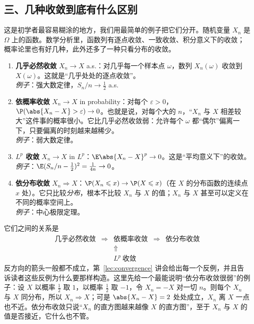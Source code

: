 \subsection*{三、几种收敛到底有什么区别}

这是初学者最容易糊涂的地方，我们用最简单的例子把它们分开。随机变量 $X_n$ 是 $\Omega$ 上的函数。数学分析里，函数列有逐点收敛、一致收敛、积分意义下的收敛；概率论里也有好几种，此外还多了一种只看分布的收敛。

\begin{enumerate}
\item \textbf{几乎必然收敛} $X_n\to X$ a.s.：对几乎每一个样本点 $\omega$，数列 $X_n(\omega)$ 收敛到 $X(\omega)$。这就是“几乎处处的逐点收敛”。\\
\emph{例子}：强大数定律，$S_n/n\to\frac12$ a.s.
\item \textbf{依概率收敛} $X_n\to X$ in probability：对每个 $\varepsilon>0$，$\P(\abs{X_n-X}>\varepsilon)\to0$。也就是说，对每个大的 $n$，“$X_n$ 与 $X$ 相差较大”这件事的概率很小。它比几乎必然收敛弱：允许每个 $\omega$ 都“偶尔”偏离一下，只要偏离的时刻越来越稀少。\\
\emph{例子}：弱大数定律。
\item \textbf{$L^p$ 收敛} $X_n\to X$ in $L^p$：$\E\abs{X_n-X}^p\to0$。这是“平均意义下”的收敛。\\
\emph{例子}：$\E(S_n/n-\frac12)^2=\frac1{4n}\to0$。
\item \textbf{依分布收敛} $X_n\Rightarrow X$：$\P(X_n\leqslant x)\to \P(X\leqslant x)$（在 $X$ 的分布函数的连续点 $x$ 处）。它只比较\emph{分布}，根本不比较 $X_n$ 与 $X$ 的值；$X_n$ 与 $X$ 甚至可以定义在不同的概率空间上。\\
\emph{例子}：中心极限定理。
\end{enumerate}

它们之间的关系是
\[
\begin{array}{ccccc}
\text{几乎必然收敛}&\Longrightarrow&\text{依概率收敛}&\Longrightarrow&\text{依分布收敛}\\
&&\Uparrow&&\\
&&L^p\ \text{收敛}&&
\end{array}
\]
反方向的箭头一般都不成立，第~\ref{lec:convergence} 讲会给出每一个反例，并且告诉读者这些反例为什么要那样构造。这里先给一个最能说明“依分布收敛很弱”的例子：设 $X$ 以概率 $\frac12$ 取 $1$，以概率 $\frac12$ 取 $-1$，令 $X_n=-X$ 对一切 $n$。则每个 $X_n$ 与 $X$ 同分布，所以 $X_n\Rightarrow X$；可是 $\abs{X_n-X}=2$ 处处成立，$X_n$ 离 $X$ 一点也不近。依分布收敛只说“$X_n$ 的直方图越来越像 $X$ 的直方图”，至于 $X_n$ 与 $X$ 的值是否接近，它什么也不管。

